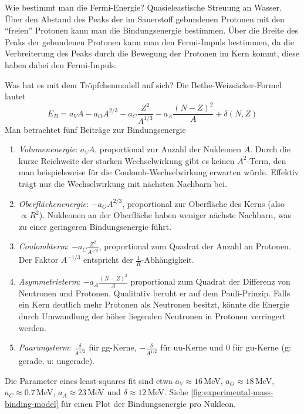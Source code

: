 \begin{fquestion}{Wie bestimmt man die Fermi-Energie?}
    Quasieleastische Streuung an Wasser. 
    Über den Abstand des Peaks der im Sauerstoff gebundenen Protonen mit den ``freien'' Protonen kann man die Bindungsenergie bestimmen. 
    Über die Breite des Peaks der gebundenen Protonen kann man den Fermi-Impuls bestimmen, da die Verbreiterung des Peaks durch die Bewegung der Protonen im Kern kommt, diese haben dabei den Fermi-Impuls. 
\end{fquestion}

\begin{fquestion}{Was hat es mit dem Tröpfchenmodell auf sich?}
    Die Bethe-Weizsäcker-Formel lautet
    $$E_B = a_V A - a_O A^{2/3} - a_C \frac{Z^2}{A^{1/3}} - a_A \frac{(N - Z)^2}{A} + \delta(N, Z)$$
    Man betrachtet fünf Beiträge zur Bindungsenergie
    \begin{enumerate}
        \item \emph{Volumenenergie}: $a_VA$, proportional zur Anzahl der Nukleonen $A$.
        Durch die kurze Reichweite der starken Wechselwirkung gibt es keinen $A^2$-Term, den man beispielsweise für die Coulomb-Wechselwirkung erwarten würde.
        Effektiv trägt nur die Wechselwirkung mit nächsten Nachbarn bei.
        \item \emph{Oberflächenenergie}: $-a_OA^{2/3}$, proportional zur Oberfläche des Kerns (also $\propto R^2$).
        Nukleonen an der Oberfläche haben weniger nächste Nachbarn, was zu einer geringeren Bindungsenergie führt.
        \item \emph{Coulombterm}: $-a_C \frac{Z^2}{A^{1/3}}$, proportional zum Quadrat der Anzahl an Protonen.
        Der Faktor $A^{-1/3}$ entspricht der $\frac{1}{R}$-Abhängigkeit.
        \item \emph{Asymmetrieterm}: $-a_A \frac{(N-Z)^2}{A}$ proportional zum Quadrat der Differenz von Neutronen und Protonen. 
        Qualitativ beruht er auf dem Pauli-Prinzip.
        Falls ein Kern deutlich mehr Protonen als Neutronen besitzt, könnte die Energie durch Umwandlung der höher liegenden Neutronen in Protonen verringert werden.
        \item \emph{Paarungsterm}: $\frac{\delta}{A^{1/2}} $ für gg-Kerne, $-\frac{\delta}{A^{1/2}} $ für uu-Kerne und 0 für gu-Kerne (g: gerade, u: ungerade).
    \end{enumerate}
    Die Parameter eines least-squares fit sind etwa $a_V \approx 16\,$MeV, $a_O \approx 18\,$MeV, $a_C \approx 0.7\,$MeV, $a_A \approx 23\,$MeV und $\delta \approx 12\,$MeV.
    Siehe \autoref{fig:experimental-mass-binding-model} für einen Plot der Bindungsenergie pro Nukleon.
\end{fquestion}

